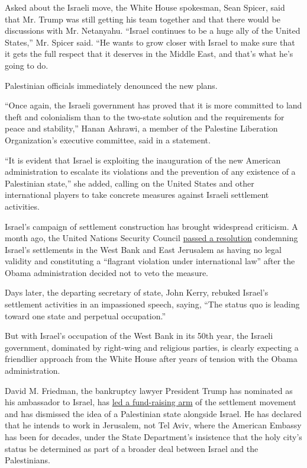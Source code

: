 Asked about the Israeli move, the White House spokesman, Sean Spicer,
said that Mr. Trump was still getting his team together and that there
would be discussions with Mr. Netanyahu. ``Israel continues to be a huge
ally of the United States,'' Mr. Spicer said. ``He wants to grow closer
with Israel to make sure that it gets the full respect that it deserves
in the Middle East, and that's what he's going to do.

Palestinian officials immediately denounced the new plans.

``Once again, the Israeli government has proved that it is more
committed to land theft and colonialism than to the two-state solution
and the requirements for peace and stability,'' Hanan Ashrawi, a member
of the Palestine Liberation Organization's executive committee, said in
a statement.

``It is evident that Israel is exploiting the inauguration of the new
American administration to escalate its violations and the prevention of
any existence of a Palestinian state,'' she added, calling on the United
States and other international players to take concrete measures against
Israeli settlement activities.

Israel's campaign of settlement construction has brought widespread
criticism. A month ago, the United Nations Security Council
\href{https://www.nytimes.com/2016/12/23/world/middleeast/israel-settlements-un-vote.html?hp\&action=click\&pgtype=Homepage\&clickSource=story-heading\&module=first-column-region\&region=top-news\&WT.nav=top-news}{passed
a resolution} condemning Israel's settlements in the West Bank and East
Jerusalem as having no legal validity and constituting a ``flagrant
violation under international law'' after the Obama administration
decided not to veto the measure.

Days later, the departing secretary of state, John Kerry, rebuked
Israel's settlement activities in an impassioned speech, saying, ``The
status quo is leading toward one state and perpetual occupation.''

But with Israel's occupation of the West Bank in its 50th year, the
Israeli government, dominated by right-wing and religious parties, is
clearly expecting a friendlier approach from the White House after years
of tension with the Obama administration.

David M. Friedman, the bankruptcy lawyer President Trump has nominated
as his ambassador to Israel, has
\href{https://www.nytimes.com/2016/12/16/world/middleeast/david-friedman-us-ambassador-israel.html}{led
a fund-raising arm} of the settlement movement and has dismissed the
idea of a Palestinian state alongside Israel. He has declared that he
intends to work in Jerusalem, not Tel Aviv, where the American Embassy
has been for decades, under the State Department's insistence that the
holy city's status be determined as part of a broader deal between
Israel and the Palestinians.

